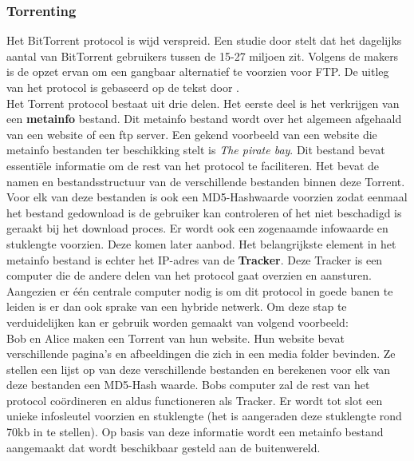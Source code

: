  \subsubsection{Torrenting}
Het BitTorrent protocol is wijd verspreid. Een studie door \textcite{Wang2013} stelt dat het dagelijks aantal van BitTorrent gebruikers tussen de 15-27 miljoen zit. Volgens de makers is de opzet ervan om een gangbaar alternatief te voorzien voor FTP. De uitleg van het protocol is gebaseerd op de tekst door \textcite{Fonseca2005}.\\ 

Het Torrent protocol bestaat uit drie delen. Het eerste deel is het verkrijgen van een \textbf{metainfo} bestand. Dit metainfo bestand wordt over het algemeen afgehaald van een website of een ftp server. Een gekend voorbeeld van een website die metainfo bestanden ter beschikking stelt is \textit{The pirate bay}. Dit bestand bevat essentiële informatie om de rest van het protocol te faciliteren. Het bevat de namen en bestandsstructuur van de verschillende bestanden binnen deze Torrent. Voor elk van deze bestanden is ook een MD5-Hashwaarde voorzien zodat eenmaal het bestand gedownload is de gebruiker kan controleren of het niet beschadigd is geraakt bij het download proces. Er wordt ook een zogenaamde infowaarde en stuklengte voorzien. Deze komen later aanbod. Het belangrijkste element in het metainfo bestand is echter het IP-adres van de \textbf{Tracker}. Deze Tracker is een computer die de andere delen van het protocol gaat overzien en aansturen. Aangezien er één centrale computer nodig is om dit protocol in goede banen te leiden is er dan ook sprake van een hybride netwerk. Om deze stap te verduidelijken kan er gebruik worden gemaakt van volgend voorbeeld:\\

Bob en Alice maken een Torrent van hun website. Hun website bevat verschillende pagina's en afbeeldingen die zich in een media folder bevinden. Ze stellen een lijst op van deze verschillende bestanden en berekenen voor elk van deze bestanden een MD5-Hash waarde. Bobs computer zal de rest van het protocol coördineren en aldus functioneren als Tracker. Er wordt tot slot een unieke infosleutel voorzien en stuklengte (het is aangeraden deze stuklengte rond 70kb in te stellen). Op basis van deze informatie wordt een metainfo bestand aangemaakt dat wordt beschikbaar gesteld aan de buitenwereld.\\

